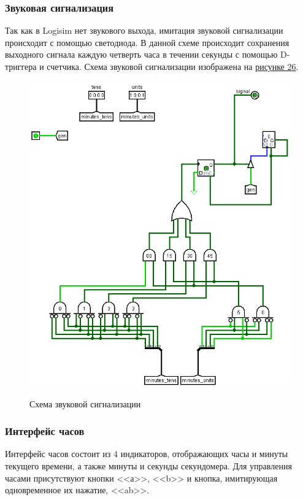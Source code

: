 \documentclass[10pt,a4paper,final]{article} %
\begin{document}
\subsubsection{Звуковая сигнализация}
Так как в Logisim нет звукового выхода, имитация звуковой сигнализации происходит с помощью светодиода.
В данной схеме происходит сохранения выходного сигнала каждую четверть часа в течении секунды с помощью D-триггера и счетчика. 
Схема звуковой сигнализации изображена на  \hyperref[signal]{рисунке 26}.
\newpage
\begin{figure}[htpb]
	\centering
	\includegraphics[scale=0.4]{logisim/img/signal.png}
	\label{signal} 
	\caption{Схема звуковой сигнализации }
\end{figure}

\subsubsection{Интерфейс часов}
Интерфейс часов состоит из 4 индикаторов, отображающих часы и минуты текущего времени, а также минуты и секунды секундомера. Для управления часами присутствуют кнопки <<а>>, <<b>> и кнопка, имитирующая одновременное их нажатие, <<ab>>.
\end{document}
